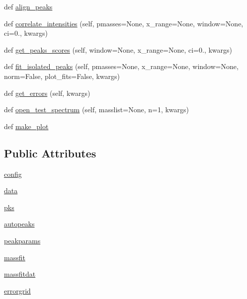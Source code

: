 \begin{DoxyCompactItemize}
\item 
def \hyperlink{class_uni_dec_1_1unidec_1_1_uni_dec_a88b4160d18bf6dd1f910197ce23b7e06}{align\+\_\+peaks}
\item 
def \hyperlink{class_uni_dec_1_1unidec_1_1_uni_dec_a2db533d7a383e2bd7a8d031a2865cc4a}{correlate\+\_\+intensities} (self, pmasses=None, x\+\_\+range=None, window=None, ci=0., kwargs)
\item 
def \hyperlink{class_uni_dec_1_1unidec_1_1_uni_dec_af1f98ae0b18ea9be2fbec16be86ce940}{get\+\_\+peaks\+\_\+scores} (self, window=None, x\+\_\+range=None, ci=0., kwargs)
\item 
def \hyperlink{class_uni_dec_1_1unidec_1_1_uni_dec_a99520cdc15ff2620cbf0f85e6c1c2a5c}{fit\+\_\+isolated\+\_\+peaks} (self, pmasses=None, x\+\_\+range=None, window=None, norm=False, plot\+\_\+fits=False, kwargs)
\item 
def \hyperlink{class_uni_dec_1_1unidec_1_1_uni_dec_a4cd16745c635c9617d5daeac315e2ba9}{get\+\_\+errors} (self, kwargs)
\item 
def \hyperlink{class_uni_dec_1_1unidec_1_1_uni_dec_a9bb988c8b235ee4b85be2105e0471f58}{open\+\_\+test\+\_\+spectrum} (self, masslist=None, n=1, kwargs)
\item 
def \hyperlink{class_uni_dec_1_1unidec_1_1_uni_dec_a45a7b5804f2e99148ba0971c3994afcb}{make\+\_\+plot}
\end{DoxyCompactItemize}
\subsection*{Public Attributes}
\begin{DoxyCompactItemize}
\item 
\hyperlink{class_uni_dec_1_1unidec_1_1_uni_dec_a28836be64118dfcd95997b61d1782a33}{config}
\item 
\hyperlink{class_uni_dec_1_1unidec_1_1_uni_dec_a3cf4b446d2c713a95cfdd928bbca79b8}{data}
\item 
\hyperlink{class_uni_dec_1_1unidec_1_1_uni_dec_ac3b8504e02825eb0c504efd7172973a4}{pks}
\item 
\hyperlink{class_uni_dec_1_1unidec_1_1_uni_dec_a06b503d2d3afacf60b5348e1a8ccd0ae}{autopeaks}
\item 
\hyperlink{class_uni_dec_1_1unidec_1_1_uni_dec_a82f0bb441368fe7ba86423e7c2833bdd}{peakparams}
\item 
\hyperlink{class_uni_dec_1_1unidec_1_1_uni_dec_a342644901005aaf3f7dd7dd89701976e}{massfit}
\item 
\hyperlink{class_uni_dec_1_1unidec_1_1_uni_dec_a120ae2912e23a3078bbbe7a20544c05a}{massfitdat}
\item 
\hyperlink{class_uni_dec_1_1unidec_1_1_uni_dec_a5700b9c26db162c8051d4a37da2f047d}{errorgrid}
\end{DoxyCompactItemize}


